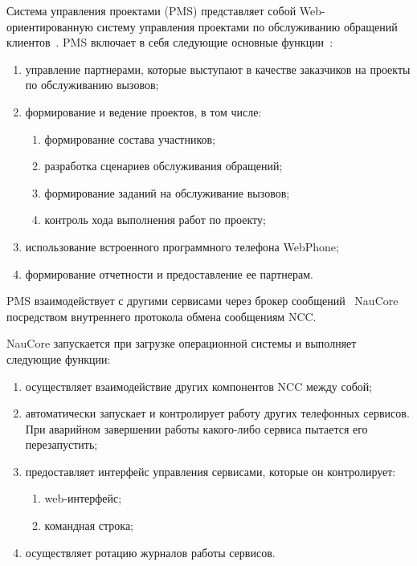 Система управления проектами (PMS) представляет собой Web-ориентированную систему
управления проектами по обслуживанию обращений клиентов~\cite{hamdytaha2002}.
PMS включает в себя следующие основные функции~\cite{doc:pms}:
\begin{enumerate}
    \item управление партнерами, которые выступают в качестве заказчиков на проекты по обслуживанию вызовов;
    \item формирование и ведение проектов, в том числе:
    \begin{enumerate}
        \item формирование состава участников;
        \item разработка сценариев обслуживания обращений;
        \item формирование заданий на обслуживание вызовов;
        \item контроль хода выполнения работ по проекту;
    \end{enumerate}
    \item использование встроенного программного телефона WebPhone;
    \item формирование отчетности и предоставление ее партнерам.
\end{enumerate}

PMS взаимодействует с другими сервисами через брокер сообщений~\cite{habr:microservice} NauCore посредством внутреннего протокола обмена сообщениям NCC\@.

NauCore запускается при загрузке операционной системы и выполняет следующие функции:
\begin{enumerate}
    \item осуществляет взаимодействие других компонентов NCC между собой;
    \item автоматически запускает и контролирует работу других телефонных сервисов. При аварийном завершении работы какого-либо сервиса пытается его перезапустить;
    \item предоставляет интерфейс управления сервисами, которые он контролирует:
    \begin{enumerate}
        \item web-интерфейс;
        \item командная строка;
    \end{enumerate}
    \item осуществляет ротацию журналов работы сервисов.
\end{enumerate}

